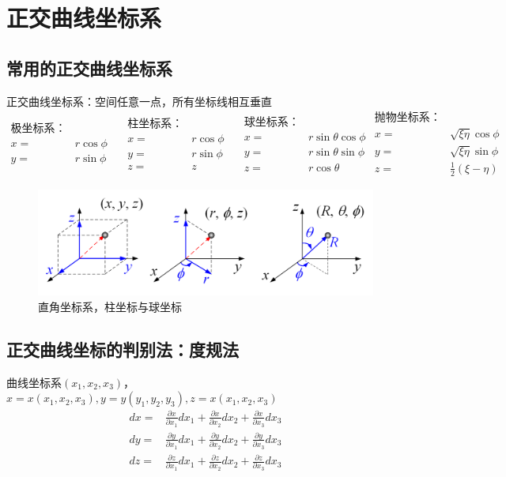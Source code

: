 \newpage
\section{正交曲线坐标系}
\subsection{常用的正交曲线坐标系}
正交曲线坐标系：空间任意一点，所有坐标线相互垂直
$$\begin{aligned}
\text{极坐标系：}\\
x=&r\cos\phi\\
y=&r\sin\phi
\end{aligned}
\quad
\begin{aligned}
\text{柱坐标系：}\\
x=&r\cos\phi\\
y=&r\sin\phi\\
z=&z
\end{aligned}
\quad
\begin{aligned}
\text{球坐标系：}\\
x=&r\sin\theta\cos\phi\\
y=&r\sin\theta\sin\phi\\
z=&r\cos\theta
\end{aligned}
\begin{aligned}
    \text{抛物坐标系：}\\
    x=&\sqrt{\xi\eta}\cos\phi\\
    y=&\sqrt{\xi\eta}\sin\phi\\
    z=&\frac{1}{2}(\xi-\eta)
\end{aligned}
$$

\begin{figure}[H]
    \centering 
    \includegraphics[width=13cm]{figures/3Coordinates.png} 
    \caption{直角坐标系，柱坐标与球坐标} 
    \label{3Coordinates}
\end{figure}

\subsection{正交曲线坐标的判别法：度规法}
曲线坐标系$(x_1,x_2,x_3)$，$x=x(x_1,x_2,x_3),y=y(y_1,y_2,y_3),z=x(x_1,x_2,x_3)$
$$\begin{aligned}
    dx=&\frac{\partial x}{\partial x_1}dx_1+\frac{\partial x}{\partial x_2}dx_2+\frac{\partial x}{\partial x_3}dx_3\\
    dy=&\frac{\partial y}{\partial x_1}dx_1+\frac{\partial y}{\partial x_2}dx_2+\frac{\partial y}{\partial x_3}dx_3\\
    dz=&\frac{\partial z}{\partial x_1}dx_1+\frac{\partial z}{\partial x_2}dx_2+\frac{\partial z}{\partial x_3}dx_3
\end{aligned}$$

